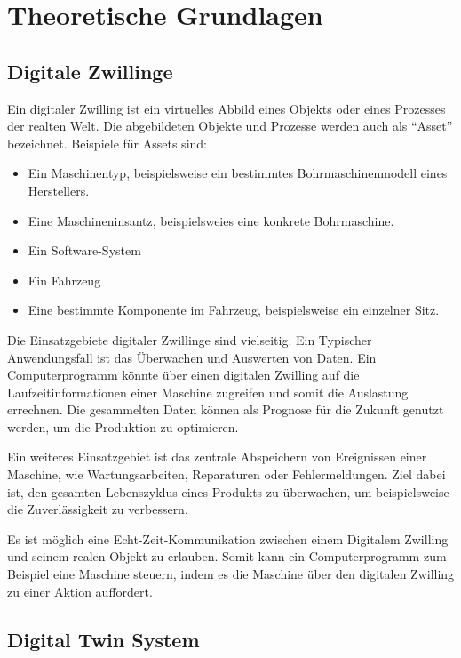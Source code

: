 \chapter{Theoretische Grundlagen}
\fancyhfStyleContent{}


\section{Digitale Zwillinge}

Ein digitaler Zwilling ist ein virtuelles Abbild eines Objekts oder eines Prozesses der realten Welt. Die abgebildeten Objekte und Prozesse werden auch als "`Asset"' bezeichnet. Beispiele für Assets sind:
\begin{itemize}
	\item Ein Maschinentyp, beispielsweise ein bestimmtes Bohrmaschinenmodell eines Herstellers.
	\item Eine Maschineninsantz, beispielsweies eine konkrete Bohrmaschine.
	\item Ein Software-System
	\item Ein Fahrzeug
	\item Eine bestimmte Komponente im Fahrzeug, beispielsweise ein einzelner Sitz.
\end{itemize}

Die Einsatzgebiete digitaler Zwillinge sind vielseitig. Ein Typischer Anwendungsfall ist das Überwachen und Auswerten von Daten. Ein Computerprogramm könnte über einen digitalen Zwilling auf die Laufzeitinformationen einer Maschine zugreifen und somit die Auslastung errechnen. Die gesammelten Daten können als Prognose für die Zukunft genutzt werden, um die Produktion zu optimieren.

Ein weiteres Einsatzgebiet ist das zentrale Abspeichern von Ereignissen einer Maschine, wie Wartungsarbeiten, Reparaturen oder Fehlermeldungen. Ziel dabei ist, den gesamten Lebenszyklus eines Produkts zu überwachen, um beispielsweise die Zuverlässigkeit zu verbessern.

Es ist möglich eine Echt-Zeit-Kommunikation zwischen einem Digitalem Zwilling und seinem realen Objekt zu erlauben. Somit kann ein Computerprogramm zum Beispiel eine Maschine steuern, indem es die Maschine über den digitalen Zwilling zu einer Aktion auffordert.


\section{Digital Twin System}

